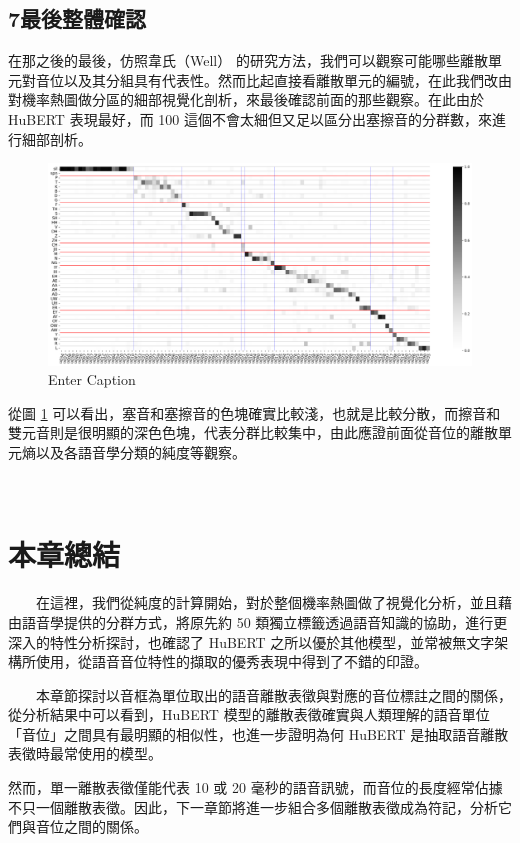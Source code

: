 {
}


\subsection{7最後整體確認}


        在那之後的最後，仿照韋氏（Well） \cite{wells_phonetic_2022} 的研究方法，我們可以觀察可能哪些離散單元對音位以及其分組具有代表性。然而比起直接看離散單元的編號，在此我們改由對機率熱圖做分區的細部視覺化剖析，來最後確認前面的那些觀察。在此由於 HuBERT 表現最好，而 100 這個不會太細但又足以區分出塞擦音的分群數，來進行細部剖析。

\begin{figure}
    \centering
    \includegraphics[width=0.5\linewidth]{figures/sdfasdfasdfaqqqqqqqq.png}
    \caption{Enter Caption}
    \label{sdfasdfasdfaqqqqqqqq}
\end{figure}

        從圖 \ref{sdfasdfasdfaqqqqqqqq} 可以看出，塞音和塞擦音的色塊確實比較淺，也就是比較分散，而擦音和雙元音則是很明顯的深色色塊，代表分群比較集中，由此應證前面從音位的離散單元熵以及各語音學分類的純度等觀察。




{

\section{本章總結}


　　在這裡，我們從純度的計算開始，對於整個機率熱圖做了視覺化分析，並且藉由語音學提供的分群方式，將原先約 50 類獨立標籤透過語音知識的協助，進行更深入的特性分析探討，也確認了 HuBERT 之所以優於其他模型，並常被無文字架構所使用，從語音音位特性的擷取的優秀表現中得到了不錯的印證。



　　本章節探討以音框為單位取出的語音離散表徵與對應的音位標註之間的關係，從分析結果中可以看到，HuBERT 模型的離散表徵確實與人類理解的語音單位「音位」之間具有最明顯的相似性，也進一步證明為何 HuBERT 是抽取語音離散表徵時最常使用的模型。

        然而，單一離散表徵僅能代表 10 或 20 毫秒的語音訊號，而音位的長度經常佔據不只一個離散表徵。因此，下一章節將進一步組合多個離散表徵成為符記，分析它們與音位之間的關係。



}

